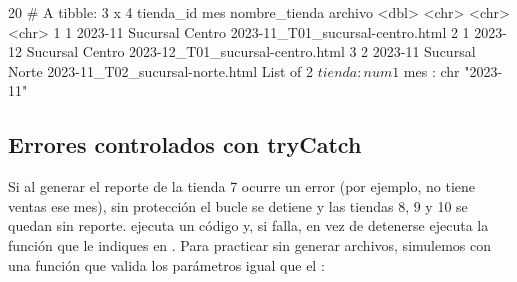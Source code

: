 \begin{rsalida}
[1] 20
# A tibble: 3 x 4
  tienda_id mes     nombre_tienda   archivo                         
      <dbl> <chr>   <chr>           <chr>                           
1         1 2023-11 Sucursal Centro 2023-11_T01_sucursal-centro.html
2         1 2023-12 Sucursal Centro 2023-12_T01_sucursal-centro.html
3         2 2023-11 Sucursal Norte  2023-11_T02_sucursal-norte.html 
List of 2
 $ tienda: num 1
 $ mes   : chr "2023-11"
\end{rsalida}

\subsection{Errores controlados con tryCatch}

Si al generar el reporte de la tienda 7 ocurre un error (por ejemplo, no
tiene ventas ese mes), sin protección el bucle se detiene y las tiendas 8, 9
y 10 se quedan sin reporte.  ejecuta un código y, si
falla, en vez de detenerse ejecuta la función que le indiques en
. Para practicar sin generar archivos, simulemos
 con una función que valida los parámetros igual que el
:

